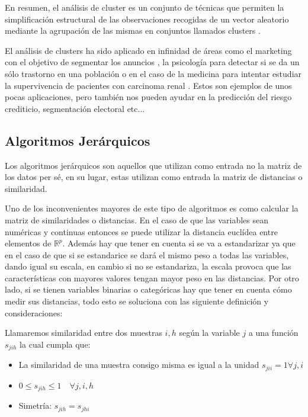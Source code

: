 \noindent En resumen, el análisis de cluster es un conjunto de técnicas que permiten la simplificación estructural de las observaciones recogidas de un vector aleatorio mediante la agrupación de las mismas en conjuntos llamados clusters \cite{Everitt 2011}. 

\noindent El análisis de clusters ha sido aplicado en infinidad de áreas como el marketing con el objetivo de segmentar los anuncios \cite{Okazaki 2006}, la psicología para detectar si se da un sólo trastorno en una población \cite{Everitt 2002} o en el caso de la medicina para intentar estudiar la supervivencia de pacientes con carcinoma renal \cite{Witten 2010}. Estos son ejemplos de unos pocas aplicaciones, pero también nos pueden ayudar en la predicción del riesgo crediticio, segmentación electoral etc... 
\subsection{Algoritmos Jerárquicos}

\noindent Los algoritmos jerárquicos son aquellos que utilizan como entrada no la matriz de los datos per sé, en su lugar, estas utilizan como entrada la matriz de distancias o similaridad.

\noindent Uno de los inconvenientes mayores de este tipo de algoritmos es como calcular la matriz de similaridades o distancias. En el caso de que las variables sean numéricas y continuas entonces se puede utilizar la distancia euclídea entre elementos de $\mathbb{R}^p$. Además hay que tener en cuenta si se va a estandarizar ya que en el caso de que si se estandarice se dará el mismo peso a todas las variables, dando igual su escala, en cambio si no se estandariza, la escala provoca que las características con mayores valores tengan mayor peso en las distancias. Por otro lado, si se tienen variables binarias o categóricas hay que tener en cuenta cómo medir sus distancias, todo esto se soluciona con las siguiente definición y consideraciones:

\begin{defi}
Llamaremos similaridad entre dos muestras $i,h$ según la variable $j$ a una función $s_{jih}$ la cual cumpla que:
\begin{itemize}
\item La similaridad de una muestra consigo misma es igual a la unidad $s_{jii}=1 \forall j,i$
\item $0\leq s_{jih} \leq 1\quad \forall j,i,h $
\item Simetría: $s_{jih}=s_{jhi}$
\end{itemize}
\end{defi}

